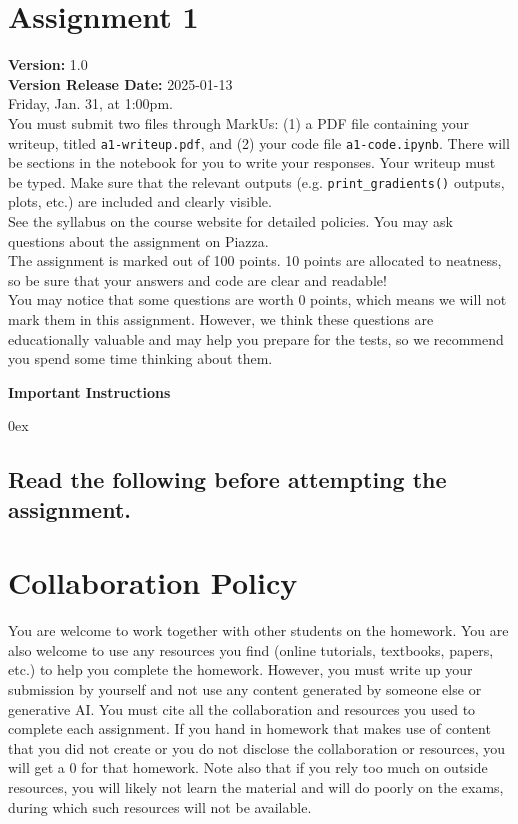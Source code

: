 \documentclass[11pt]{article}
\newcommand{\releaseDate}{2025-01-13}
\newcommand{\dueDate}{{Friday, Jan. 31, at 1:00pm}}
\newcommand{\writeupFile}{\texttt{a1-writeup.pdf}}
\newcommand{\submitCodeFile}{\texttt{a1-code.ipynb}}
\newlength{\instructionswidth}
\newenvironment{instructions}{\begin{lrbox}{\instructionsbox}\begin{minipage}[t]{\instructionswidth}\begin{center}{\large\bf {{\color{red} Important Instructions}}}\end{center}\itemsep 0ex\small}{\end{minipage}\end{lrbox}\begin{center}\fbox{\usebox{\instructionsbox}}\end{center}\medskip}
\begin{document}
    \section*{Assignment 1}
    {\bf Version:} 1.0\\
    {\bf Version Release Date:} \releaseDate \\
    
     \dueDate. \\
    
    You must submit two files through MarkUs: (1) a PDF file containing your writeup, titled \writeupFile, and (2) your code file \submitCodeFile. There will be sections in the notebook for you to write your responses. Your writeup must be typed.  
    Make sure that the relevant outputs (e.g. \texttt{print\_gradients()} outputs, plots, etc.) are included and clearly visible. \\
    
    \noindent See the syllabus on the course website for detailed policies. You may ask questions about the assignment on Piazza. \\

    \noindent The assignment is marked out of 100 points. 10 points are allocated to neatness, so be sure that your answers and code are clear and readable! \\
    
    \noindent You may notice that some questions are worth 0 points, which means we will not mark them in this assignment. However, we think these questions are educationally valuable and may help you prepare for the tests, so we recommend you spend some time thinking about them.\\
   
    \bigskip
\pagebreak


\begin{instructions}
    
    \centering\subsection*{{\color{red} Read the following before attempting the assignment.}}
\end{instructions}
\bigskip
\section*{Collaboration Policy}
You are welcome to work together with other students on the homework. You are also welcome to use any resources you find (online tutorials, textbooks, papers, etc.) to help you complete the homework. However, you must write up your submission by yourself and not use any content generated by someone else or generative AI. You must cite all the collaboration and resources you used to complete each assignment. If you hand in homework that makes use of content that you did not create or you do not disclose the collaboration or resources, you will get a 0 for that homework. Note also that if you rely too much on outside resources, you will likely not learn the material and will do poorly on the exams, during which such resources will not be available.\\
\end{document}

